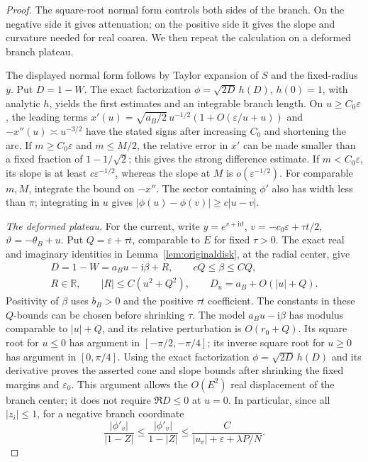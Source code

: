 \documentclass[11pt]{article}
\numberwithin{equation}{section}
\theoremstyle{definition}
\newcommand{\ii}{\mathrm i}
\newcommand{\R}{\mathbb R}
\newcommand{\eps}{\varepsilon}
\begin{document}
\begin{proof}
The square-root normal form controls both sides of the branch. On the negative side it gives attenuation; on the positive side it gives the slope and curvature needed for real coarea. We then repeat the calculation on a deformed branch plateau.

The displayed normal form follows by Taylor expansion of \(S\) and
the fixed-radius \(y\). Put \(D=1-W\).
The exact factorization \(\phi=\sqrt{2D}\,h(D)\), \(h(0)=1\),
with analytic \(h\), yields the first estimates and an integrable
branch length. On \(u\ge C_0\eps\), the leading terms
\(x'(u)=\sqrt{a_B/2}\,u^{-1/2}(1+O(\eps/u+u))\) and
\(-x''(u)\asymp u^{-3/2}\) have the stated signs after increasing
\(C_0\) and shortening the arc.
If \(m\ge C_0\eps\) and \(m\le M/2\), the relative error in
\(x'\) can be made smaller than a fixed fraction of
\(1-1/\sqrt2\); this gives the strong difference estimate.
If \(m<C_0\eps\), its slope is at least \(c\eps^{-1/2}\),
whereas the slope at \(M\) is \(o(\eps^{-1/2})\).
For comparable \(m,M\), integrate the bound on \(-x''\).
The sector containing \(\phi'\) also has width less than \(\pi\);
integrating in \(u\) gives
\(|\phi(u)-\phi(v)|\ge c|u-v|\).

\smallskip\noindent\textit{The deformed plateau.}
For the current, write \(y=e^{v+\ii\vartheta}\),
\(v=-c_0\eps+\tau t/2\), \(\vartheta=-\theta_B+u\).
Put \(Q=\eps+\tau t\), comparable to \(E\) for fixed \(\tau>0\).
The exact real and imaginary identities in
Lemma~\ref{lem:originaldisk}, at the radial center, give
\begin{gather*}
 D=1-W=a_Bu-\ii\beta+R,\qquad cQ\le\beta\le CQ,\\
 R\in\R,\qquad |R|\le C(u^2+Q^2),\qquad
 D_u=a_B+O(|u|+Q).
\end{gather*}
Positivity of \(\beta\) uses \(b_B>0\) and the positive
\(\tau t\) coefficient. The constants in these \(Q\)-bounds
can be chosen before shrinking \(\tau\). The model
\(a_Bu-\ii\beta\) has modulus comparable to \(|u|+Q\), and
its relative perturbation is \(O(r_0+Q)\). Its square root for \(u\le0\) has argument
in \([-\pi/2,-\pi/4]\); its inverse square root for \(u\ge0\)
has argument in \([0,\pi/4]\). Using the exact factorization
\(\phi=\sqrt{2D}\,h(D)\) and its derivative proves the asserted
cone and slope bounds after shrinking the fixed margins and
\(\eps_0\). This argument allows the \(O(E^2)\) real displacement
of the branch center; it does not require \(\Re D\le0\) at \(u=0\).
In particular, since all \(|z_i|\le1\), for a negative branch
coordinate
\[
 \frac{|\phi'_v|}{|1-Z|}
 \le\frac{|\phi'_v|}{1-|Z|}
 \le\frac C{|u_v|+\eps+\lambda P/N}.
\]
\end{proof}
\end{document}
